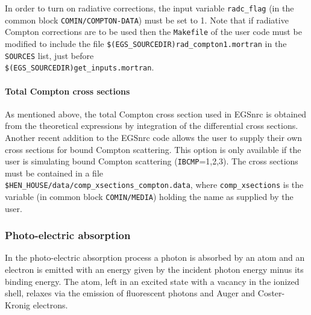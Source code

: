 In order to turn on radiative corrections, the input variable
{\tt radc\_flag} (in the common block
{\tt COMIN/COMPTON-DATA}) must be set to 1.
Note that if radiative 
Compton corrections
are to be used then the {\tt Makefile} of the user code must
be modified to include the file {\tt \$(EGS\_SOURCEDIR)rad\_compton1.mortran}
in the {\tt SOURCES} list, just before\\
 {\tt \$(EGS\_SOURCEDIR)get\_inputs.mortran}.

\paragraph{Total Compton cross sections}\hfill
\label{comp_xsect}

As mentioned above, the total Compton cross section used in EGSnrc is obtained 
from the theoretical expressions by integration of the differential cross sections. 
Another recent addition to the EGSnrc code allows the user to supply their
own cross sections for bound Compton scattering. This option is only available
if the user is simulating bound Compton scattering 
({\tt IBCMP}=1,2,3).  The cross sections
must be contained in a file\\
 {\tt \$HEN\_HOUSE/data/comp\_xsections\_compton.data},
where {\tt comp\_xsections} is the variable 
(in common block {\tt COMIN/MEDIA}) holding the name as supplied
by the user.

\subsubsection{Photo-electric absorption}
\setcounter{equation}{0}
\label{photo}

In the photo-electric absorption process a photon is 
absorbed by an atom and an electron 
is emitted with an energy given by the incident photon 
energy minus its binding energy. 
The atom, left in an excited state with a vacancy in the 
ionized shell, relaxes via the emission of fluorescent photons and 
Auger and Coster-Kronig electrons.  

